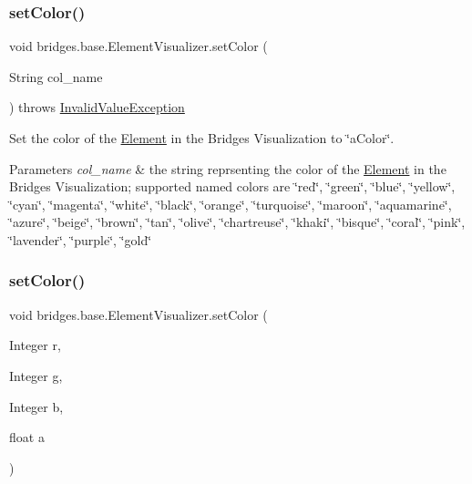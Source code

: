 \subsubsection{\texorpdfstring{setColor()}{setColor()}\hspace{0.1cm}{\footnotesize\ttfamily [1/3]}}
{\footnotesize\ttfamily void bridges.\+base.\+Element\+Visualizer.\+set\+Color (\begin{DoxyParamCaption}\item[{String}]{col\+\_\+name }\end{DoxyParamCaption}) throws \mbox{\hyperlink{classbridges_1_1validation_1_1_invalid_value_exception}{Invalid\+Value\+Exception}}}

Set the color of the \mbox{\hyperlink{classbridges_1_1base_1_1_element}{Element}} in the Bridges Visualization to \char`\"{}a\+Color\char`\"{}.


\begin{DoxyParams}{Parameters}
{\em col\+\_\+name} & the string reprsenting the color of the \mbox{\hyperlink{classbridges_1_1base_1_1_element}{Element}} in the Bridges Visualization; supported named colors are \char`\"{}red\char`\"{}, \char`\"{}green\char`\"{}, \char`\"{}blue\char`\"{}, \char`\"{}yellow\char`\"{}, \char`\"{}cyan\char`\"{}, \char`\"{}magenta\char`\"{}, \char`\"{}white\char`\"{}, \char`\"{}black\char`\"{}, \char`\"{}orange\char`\"{}, \char`\"{}turquoise\char`\"{}, \char`\"{}maroon\char`\"{}, \char`\"{}aquamarine\char`\"{}, \char`\"{}azure\char`\"{}, \char`\"{}beige\char`\"{}, \char`\"{}brown\char`\"{}, \char`\"{}tan\char`\"{}, \char`\"{}olive\char`\"{}, \char`\"{}chartreuse\char`\"{}, \char`\"{}khaki\char`\"{}, \char`\"{}bisque\char`\"{}, \char`\"{}coral\char`\"{}, \char`\"{}pink\char`\"{}, \char`\"{}lavender\char`\"{}, \char`\"{}purple\char`\"{}, \char`\"{}gold\char`\"{} \\
\hline
\end{DoxyParams}
\mbox{\label{classbridges_1_1base_1_1_element_visualizer_a84fad1c8abe43b20c68c1800d7630918}} 
\subsubsection{\texorpdfstring{setColor()}{setColor()}\hspace{0.1cm}{\footnotesize\ttfamily [2/3]}}
{\footnotesize\ttfamily void bridges.\+base.\+Element\+Visualizer.\+set\+Color (\begin{DoxyParamCaption}\item[{Integer}]{r,  }\item[{Integer}]{g,  }\item[{Integer}]{b,  }\item[{float}]{a }\end{DoxyParamCaption})}


